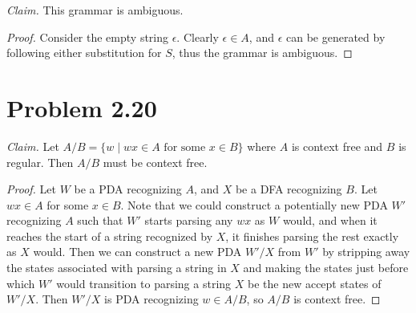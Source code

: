 \documentclass{abrice}
\begin{document}
\noindent
\emph{Claim.} This grammar is ambiguous.

\begin{proof}
  Consider the empty string $\epsilon$. Clearly $\epsilon \in A$, and $\epsilon$
  can be generated by following either substitution for $S$, thus the grammar is
  ambiguous.
\end{proof}

\section{Problem 2.20}

\emph{Claim.} Let $A/B = \{w \mid wx \in A \text{ for some } x \in B \}$ where
$A$ is context free and $B$ is regular. Then $A/B$ must be context free.

\begin{proof}
  Let $W$ be a PDA recognizing $A$, and $X$ be a DFA recognizing $B$. Let $wx
  \in A$ for some $x \in B$. Note that we could construct a potentially new PDA
  $W'$ recognizing $A$ such that $W'$ starts parsing any $wx$ as $W$ would, and
  when it reaches the start of a string recognized by $X$, it finishes parsing
  the rest exactly as $X$ would. Then we can construct a new PDA $W'/X$ from
  $W'$ by stripping away the states associated with parsing a string in $X$ and
  making the states just before which $W'$ would transition to parsing a string $X$ be
  the new accept states of $W'/X$. Then $W'/X$ is PDA recognizing $w \in A/B$,
  so $A/B$ is context free.
\end{proof}
\end{document}
